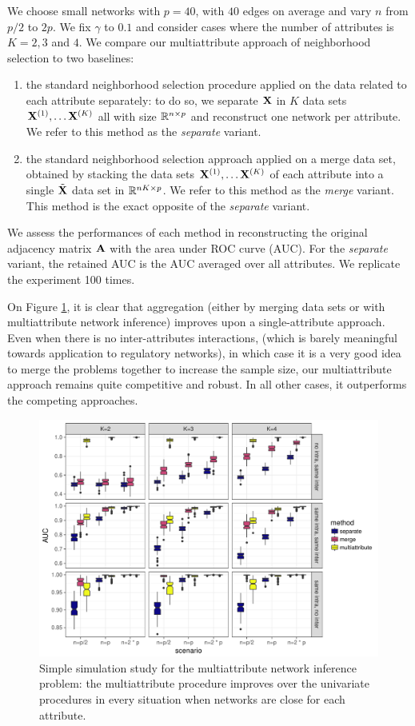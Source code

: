 We choose small networks with $p=40$, with $40$ edges on average and
vary $n$ from $p/2$ to $2p$. We fix $\gamma$ to $0.1$ and consider
cases where the number of attributes is $K=2,3$ and $4$. We compare
our multiattribute approach of neighborhood selection to two
baselines:
\begin{enumerate}
\item the standard neighborhood selection procedure applied on the
  data related to each attribute separately: to do so, we separate
  $\mathbf{X}$ in $K$ data sets $\mathbf{X}^{(1)}, \dots \mathbf{X}^{(K)}$ all with size
  $\mathbb{R}^{n\times p}$ and reconstruct one network per attribute. We
  refer to this method as the \textit{separate} variant.
\item the standard neighborhood selection approach applied on a merge
  data set, obtained by stacking the data sets
  $\mathbf{X}^{(1)}, \dots \mathbf{X}^{(K)}$ of each attribute into a single
  $\tilde{\mathbf{X}}$ data set in $\mathbb{R}^{nK \times p}$. We refer to this
  method as the \textit{merge} variant. This method is the exact
  opposite of the \textit{separate} variant.
\end{enumerate}
We assess the performances of each method in reconstructing the
original adjacency matrix $\mathbf{A}$ with the area under ROC curve
(AUC). For the \textit{separate} variant, the retained AUC is the AUC
averaged over all attributes. We replicate the experiment 100 times.

On Figure \ref{fig:simu_multi}, it is clear that aggregation (either
by merging data sets or with multiattribute network inference)
improves upon a single-attribute approach. Even when there is no
inter-attributes interactions, (which is barely meaningful towards
application to regulatory networks), in which case it is a very good
idea to merge the problems together to increase the sample size, our
multiattribute approach remains quite competitive and robust. In all
other cases, it outperforms the competing approaches.
\begin{figure}[htbp!]
  \centering
  \includegraphics[width=\textwidth]{figures/res_simu_new}
  \caption{Simple simulation study for the multiattribute network
    inference problem: the multiattribute procedure improves over the
    univariate procedures in every situation when networks are close
    for each attribute.}
  \label{fig:simu_multi}
\end{figure}
